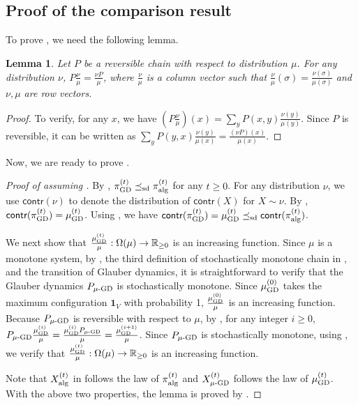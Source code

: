 \documentclass[11pt,a4paper]{article}
\newcommand{\sd}{\preceq_{\textnormal{sd}}}
\newtheorem{lemma}[theorem]{Lemma}
\theoremstyle{definition}
\def\*#1{\mathbf{#1}} %
\begin{document}
\subsection{Proof of the comparison result}\label{sec:proof-of-the-comparison-result}
To prove , we need the following lemma.
\begin{lemma}\label{lem:reversible-transition}
Let $P$ be a reversible chain with respect to distribution $\mu$. For any distribution $\nu$, $P \frac{\nu}{\mu} = \frac{\nu P}{\mu}$, where $\frac{\nu}{\mu}$ is a column vector such that $\frac{\nu}{\mu}(\sigma) = \frac{\nu(\sigma)}{\mu(\sigma)}$ and $\nu,\mu$ are row vectors.
\end{lemma}
\begin{proof}
    To verify, for any $x$, we have $(P \frac{\nu}{\mu})(x) = \sum_{y} P(x,y) \frac{\nu(y)}{\mu(y)}$. Since $P$ is reversible, it can be written as $\sum_{y} P(y,x) \frac{\nu(y)}{\mu(x)} = \frac{(\nu P)(x)}{\mu(x)}$.
\end{proof}
Now, we are ready to prove .
\begin{proof}[Proof of  assuming ]
    By , $\pi^{(t)}_{\textnormal{GD}} \sd \pi^{(t)}_{\textnormal{alg}}$ for any $t \geq 0$. For any distribution $\nu$, we use $\textsf{contr}(\nu)$ to denote the distribution of $\textsf{contr}(X)$ for $X \sim \nu$. By , $\textsf{contr}(\pi^{(t)}_{\textnormal{GD}}) = \mu^{(t)}_{\textnormal{GD}}$.
    Using , we have $\textsf{contr}(\pi^{(t)}_{\textnormal{GD}}) = \mu^{(t)}_{\textnormal{GD}} \sd \textsf{contr}(\pi^{(t)}_{\textnormal{alg}})$.
   
    We next show that $\frac{\mu^{(t)}_{\textnormal{GD}}}{\mu}: \Omega(\mu) \to \mathbb{R}_{\geq 0}$ is an increasing function.
   Since $\mu$ is a monotone system, by , the third definition of stochastically monotone chain in , and the transition of Glauber dynamics, it is straightforward to verify that the Glauber dynamics $P_{\mu\textnormal{-GD}}$ is stochastically monotone. Since $\mu^{(0)}_{\textnormal{GD}}$ takes the maximum configuration $\*1_V$ with probability 1, $\frac{\mu^{(0)}_{\textnormal{GD}}}{\mu}$ is an increasing function. Because $P_{\mu\textnormal{-GD}}$ is reversible with respect to $\mu$, by , for any integer $i\geq 0$,
    $P_{\mu\textnormal{-GD}} \frac{\mu^{(i)}_{\textnormal{GD}}}{\mu} = \frac{\mu^{(i)}_{\textnormal{GD}}P_{\mu\textnormal{-GD}}}{\mu} = \frac{\mu^{(i+1)}_{\textnormal{GD}}}{\mu}$.
    Since $P_{\mu\textnormal{-GD}}$ is stochastically monotone, using , we verify that $\frac{\mu^{(t)}_{\textnormal{GD}}}{\mu}: \Omega(\mu) \to \mathbb{R}_{\geq 0}$ is an increasing function.

    Note that $X^{(t)}_{\textnormal{alg}}$ in  follows the law of $\pi^{(t)}_{\textnormal{alg}}$ and $X^{(t)}_{\textnormal{$\mu$-GD}}$ follows the law of $\mu^{(t)}_{\textnormal{GD}}$.
    With the above two properties, the lemma is proved by .
\end{proof}
\end{document}
